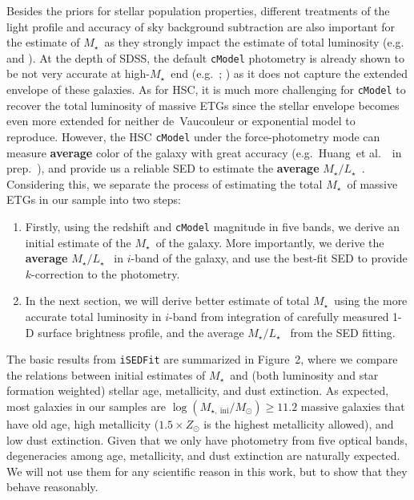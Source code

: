 \documentclass[preprint]{aastex}
\def\etal{{\ et al.~}}
\def\mstar{{$M_{\star}$}~}
\def\m2l{{$M_{\star}/L_{\star}$}~}
\begin{document}
\begin{CJK*}{UTF8}{gbsn}
    Besides the priors for stellar population properties, different treatments of 
    the light profile and accuracy of sky background subtraction are also important
    for the estimate of \mstar as they strongly impact the estimate of total luminosity
    (e.g.\ \citealt{Bernardi2013} and \citealt{DSouza2015}).  
    At the depth of SDSS, the default \texttt{cModel} photometry is already shown to 
    be not very accurate at high-\mstar end (e.g.\ \citealt{Meert2015}; 
    \citealt{Bernardi2016a}) as it does not capture the extended envelope of these 
    galaxies. 
    As for HSC, it is much more challenging for \texttt{cModel} to recover the total 
    luminosity of massive ETGs since the stellar envelope becomes even more 
    extended for neither de~Vaucouleur or exponential model to reproduce.  
    However, the HSC \texttt{cModel} under the force-photometry mode can measure 
    \textbf{average} color of the galaxy with great accuracy (e.g.\ Huang\etal~in prep.~), 
    and provide us a reliable SED to estimate the \textbf{average} \m2l. 
    Considering this, we separate the process of estimating the total \mstar of 
    massive ETGs in our sample into two steps: 
    
    \begin{enumerate}
        \item Firstly, using the redshift and \texttt{cModel} magnitude in five bands, 
            we derive an initial estimate of the \mstar of the galaxy.  
            More importantly, we derive the \textbf{average} \m2l in $i$-band of the 
            galaxy, and use the best-fit SED to provide $k$-correction to the photometry.  
        \item In the next section, we will derive better estimate of total \mstar using 
            the more accurate total luminosity in $i$-band from integration of carefully 
            measured 1-D surface brightness profile, and the average \m2l from the SED
            fitting.  
    \end{enumerate}
    
    The basic results from \texttt{iSEDFit} are summarized in Figure~2, where we compare
    the relations between initial estimates of \mstar and (both luminosity and 
    star formation weighted) stellar age, metallicity, and dust extinction. 
    As expected, most galaxies in our samples are 
    $\log(M_{\star,\ \mathrm{ini}}/M_{\odot}) \geq 11.2$ massive galaxies that have 
    old age, high metallicity ($1.5 \times Z_{\odot}$ is the highest metallicity allowed), 
    and low dust extinction.  
    Given that we only have photometry from five optical bands, degeneracies among 
    age, metallicity, and dust extinction are naturally expected.  
    We will not use them for any scientific reason in this work, but to show that they
    behave reasonably.   



\end{CJK*}
\end{document}
